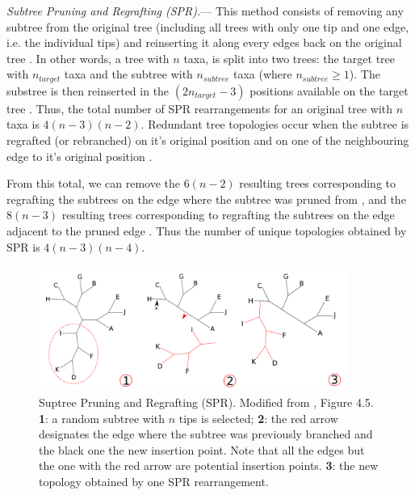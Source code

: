\documentclass[12pt,letterpaper]{article}
\renewcommand{\subsubsection}[1]{%
\vspace{2ex}
\noindent
\textit{#1.}---}
\begin{document}
\subsubsection{Subtree Pruning and Regrafting (SPR)}
This method consists of removing any subtree from the original tree (including all trees with only one tip and one edge, i.e. the individual tips) and reinserting it along every edges back on the original tree \citep[see Fig \ref{Figure_SPR} and ][]{felsenstein2004inferring}.
In other words, a tree with $n$ taxa, is split into two trees: the target tree with $n_{target}$ taxa and the subtree with $n_{subtree}$ taxa (where $n_{subtree} \geq 1$).
The substree is then reinserted in the $(2n_{target}-3)$ positions available on the target tree \citep{felsenstein2004inferring}.
Thus, the total number of SPR rearrangements for an original tree with $n$ taxa is $4(n-3)(n-2)$.
Redundant tree topologies occur when the subtree is regrafted (or rebranched) on it's original position and on one of the neighbouring edge to it's original position \citep{allen2001subtree}.


From this total, we can remove the $6(n-2)$ resulting trees corresponding to regrafting the subtrees on the edge where the subtree was pruned from \citep[i.e. the rearrangements resulting in the same topology; ][]{allen2001subtree}, and the $8(n-3)$ resulting trees corresponding to regrafting the subtrees on the edge adjacent to the pruned edge \citep{allen2001subtree}.
Thus the number of unique topologies obtained by SPR is $4(n-3)(n-4)$.

\begin{figure}[!htbp]
\centering
   \includegraphics[width=0.9\textwidth]{Figure/SPR.pdf}
\caption{Suptree Pruning and Regrafting (SPR). Modified from \cite{felsenstein2004inferring}, Figure 4.5. \textbf{1}: a random subtree with $n$ tips is selected; \textbf{2}: the red arrow designates the edge where the subtree was previously branched and the black one the new insertion point. Note that all the edges but the one with the red arrow are potential insertion points. \textbf{3}: the new topology obtained by one SPR rearrangement.}
\label{Figure_SPR}
\end{figure}
\end{document}
